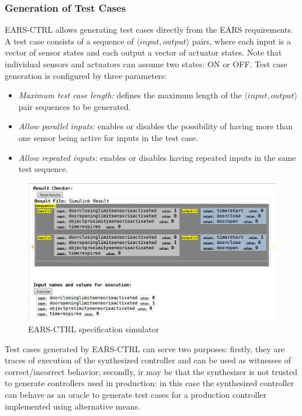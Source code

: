 \subsubsection{Generation of Test Cases}
\textsf{EARS-CTRL} allows generating test cases directly from the EARS
requirements. A test case consists of a sequence of $\langle
input, output \rangle$ pairs, where each input is a vector of sensor states
and each output a vector of actuator states. Note that individual sensors and
actuators can assume two states: \textsf{ON} or \textsf{OFF}. Test case
generation is configured by three parameters:\vspace{-.1cm}
\begin{itemize}
  \item \emph{Maximum test case length:} defines the maximum length of the
  $\langle input, output \rangle$ pair sequences to be generated.
  \item \emph{Allow parallel inputs:} enables or disables the possibility of
  having more than one sensor being active for inputs in the test case.
  \item \emph{Allow repeated inputs:} enables or disables having repeated inputs
  in the same test sequence.\vspace{-.3cm} 
\end{itemize}
\begin{figure}[h!]
   \begin{center}
     \includegraphics[width=.5\textwidth]{images/simulation.png}
     \caption{\textsf{EARS-CTRL} specification simulator}
     \label{fig:ears_simulator}
   \end{center}
   \vspace{-1cm}
 \end{figure}
Test cases generated by \textsf{EARS-CTRL} can serve two purposes: firstly, they
are traces of execution of the synthesized controller and can be used as
witnesses of correct/incorrect behavior; secondly, ir may be that the
synthesizer is not trusted to generate controllers used in production:
in this case the synthesized controller can behave as an oracle to generate test
cases for a production controller implemented using alternative
means.\vspace{-.5cm}
